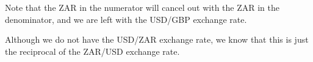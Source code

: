         
        \label{m39335*id67961}Note that the ZAR in the numerator will cancel out with the ZAR in the denominator, and we are left with the USD/GBP exchange rate.\par 
        \label{m39335*id67965}Although we do not have the USD/ZAR exchange rate, we know that this is just the reciprocal of the ZAR/USD exchange rate.\par 
        \label{m39335*id67970}\nopagebreak\noindent{}
    
